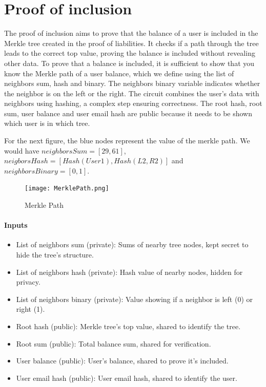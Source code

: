 \section{Proof of inclusion}
\label{subsec:pi}
The proof of inclusion aims to prove that the balance of a user is included in the Merkle tree created in the proof of liabilities. 
It checks if a path through the tree leads to the correct top value, proving the balance is included without revealing other data.
To prove that a balance is included, it is sufficient to show that you know the Merkle path of a user balance,
which we define using the list of neighbors sum, hash and binary.
The neighbors binary variable indicates whether the neighbor is on the left or the right. The circuit combines the user's data with neighbors using hashing, a complex step ensuring correctness.
The root hash, root sum, user balance and user email hash are public because it needs to be shown which user is in which tree.

For the next figure, the blue nodes represent the value of the merkle path.
We would have $neighborsSum=[29,61]$, $neigborsHash=[Hash(User1),Hash(L2,R2)]$ and $neighborsBinary=[0,1]$.
   \begin{figure}[H]
   \centering
   \texttt{[image: MerklePath.png]}
   \caption{Merkle Path}
   \label{overflow}
   \end{figure}

\paragraph{Inputs}
\begin{itemize}
   \item List of neighbors sum (private): Sums of nearby tree nodes, kept secret to hide the tree's structure.
   \item List of neighbors hash (private): Hash value of nearby nodes, hidden for privacy.
   \item List of neighbors binary (private): Value showing if a neighbor is left (0) or right (1).
   \item Root hash (public): Merkle tree's top value, shared to identify the tree.
   \item Root sum (public): Total balance sum, shared for verification.
   \item User balance (public): User's balance, shared to prove it's included.
   \item User email hash (public): User email hash, shared to identify the user.
   \end{itemize}

